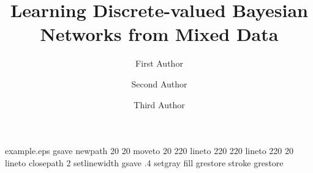 %
%
%
%
%
\begin{filecontents*}{example.eps}
gsave
newpath
  20 20 moveto
  20 220 lineto
  220 220 lineto
  220 20 lineto
closepath
2 setlinewidth
gsave
  .4 setgray fill
grestore
stroke
grestore
\end{filecontents*}
%
\RequirePackage{fix-cm}
%
\documentclass[smallextended]{svjour3}       %
%
\smartqed  %
%
\usepackage{amsmath}
\usepackage{bm}
\usepackage{graphicx} %
\usepackage{algorithm}
\usepackage{algpseudocode}
\usepackage[round]{natbib}
%
%
%
%
%


\title{Learning Discrete-valued Bayesian Networks from Mixed Data%
}


\author{First Author         \and
        Second Author         \and
        Third Author%
}


